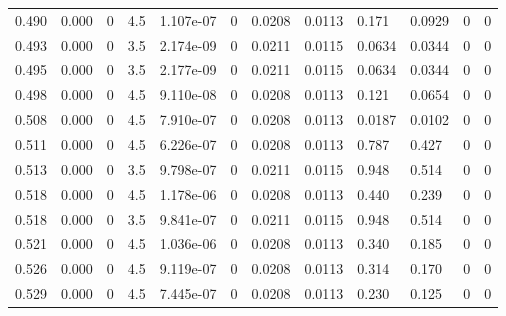 \documentclass[preview]{standalone}
\begin{document}
{{{\begin{tabular}{L{1.2cm}C{1.2cm} C{0.3cm}C{0.5cm} C{1.4cm}C{1.4cm} C{1.4cm}C{1.4cm} C{1.6cm}C{1.6cm} C{1.6cm}C{1.6cm}}
  0.490  &  0.000  & 0     & 4.5 &  1.107e-07  & 0  &  0.0208&   0.0113& 0.171 & 0.0929   &  0 & 0  \\ 
  0.493  &  0.000  & 0     & 3.5 &  2.174e-09  & 0  &  0.0211&   0.0115& 0.0634 & 0.0344   &  0 & 0  \\ 
  0.495  &  0.000  & 0     & 3.5 &  2.177e-09  & 0  &  0.0211&   0.0115& 0.0634 & 0.0344   &  0 & 0  \\ 
  0.498  &  0.000  & 0     & 4.5 &  9.110e-08  & 0  &  0.0208&   0.0113& 0.121 & 0.0654   &  0 & 0  \\ 
  0.508  &  0.000  & 0     & 4.5 &  7.910e-07  & 0  &  0.0208&   0.0113& 0.0187 & 0.0102   &  0 & 0  \\ 
  0.511  &  0.000  & 0     & 4.5 &  6.226e-07  & 0  &  0.0208&   0.0113& 0.787 & 0.427   &  0 & 0  \\ 
  0.513  &  0.000  & 0     & 3.5 &  9.798e-07  & 0  &  0.0211&   0.0115& 0.948 & 0.514   &  0 & 0  \\ 
  0.518  &  0.000  & 0     & 4.5 &  1.178e-06  & 0  &  0.0208&   0.0113& 0.440 & 0.239   &  0 & 0  \\ 
  0.518  &  0.000  & 0     & 3.5 &  9.841e-07  & 0  &  0.0211&   0.0115& 0.948 & 0.514   &  0 & 0  \\ 
  0.521  &  0.000  & 0     & 4.5 &  1.036e-06  & 0  &  0.0208&   0.0113& 0.340 & 0.185   &  0 & 0  \\ 
  0.526  &  0.000  & 0     & 4.5 &  9.119e-07  & 0  &  0.0208&   0.0113& 0.314 & 0.170   &  0 & 0  \\ 
  0.529  &  0.000  & 0     & 4.5 &  7.445e-07  & 0  &  0.0208&   0.0113& 0.230 & 0.125   &  0 & 0  \\ 
\hline 
\end{tabular} 

}}}
\end{document}
